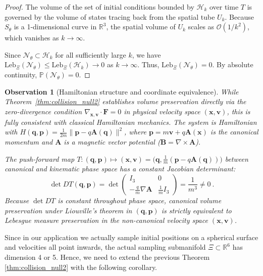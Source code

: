 \documentclass{article}
\newtheorem{obs}{Observation}
\begin{document}
\begin{proof}
		The volume of the set of initial conditions bounded by $\mathcal{H}_k$ over time $T$ is governed by the volume of states tracing back from the spatial tube $U_k$. Because $S_\theta$ is a 1-dimensional curve in $\mathbb{R}^3$, the spatial volume of $U_k$ scales as $\mathcal{O}(1/k^2)$, which vanishes as $k \to \infty$.
		
		Since $\mathcal{N}_\theta \subset \mathcal{H}_k$ for all sufficiently large $k$, we have $\mathrm{Leb}_\Xi(\mathcal{N}_\theta) \le \mathrm{Leb}_\Xi(\mathcal{H}_k) \to 0$ as $k \to \infty$. Thus, $\mathrm{Leb}_\Xi(\mathcal{N}_\theta) = 0$. By absolute continuity, $\mathbb{P}(\mathcal{N}_\theta) = 0$.
	\end{proof}
	
	\begin{obs}[Hamiltonian structure and coordinate equivalence] \label{obs:hamiltonian_equivalence}
		While Theorem~\ref{thm:collision_null2} establishes volume preservation directly via the zero-divergence condition $\nabla_{\mathbf{x},\mathbf{v}} \cdot \mathbf{F} = 0$ in physical velocity space $(\mathbf{x}, \mathbf{v})$, this is fully consistent with classical Hamiltonian mechanics. The system is Hamiltonian with $H(\mathbf{q}, \mathbf{p}) = \frac{1}{2m} \|\mathbf{p} - q\mathbf{A}(\mathbf{q})\|^2$, where $\mathbf{p} = m\mathbf{v} + q\mathbf{A}(\mathbf{x})$ is the canonical momentum and $\mathbf{A}$ is a magnetic vector potential ($\mathbf{B} = \nabla \times \mathbf{A}$). 
		
		The push-forward map $T: (\mathbf{q}, \mathbf{p}) \mapsto (\mathbf{x}, \mathbf{v}) = \big(\mathbf{q}, \frac{1}{m}(\mathbf{p} - q\mathbf{A}(\mathbf{q}))\big)$ between canonical and kinematic phase space has a constant Jacobian determinant:
		\begin{equation}
			\det D T(\mathbf{q},\mathbf{p}) = \det \begin{pmatrix} I_3 & 0 \\ -\frac{q}{m}\nabla\mathbf{A} & \frac{1}{m}I_3 \end{pmatrix} = \frac{1}{m^3} \neq 0 \ .
		\end{equation}
		Because $\det DT$ is constant throughout phase space, canonical volume preservation under Liouville's theorem in $(\mathbf{q},\mathbf{p})$ is strictly equivalent to Lebesgue measure preservation in the non-canonical velocity space $(\mathbf{x},\mathbf{v})$.
	\end{obs}
	
	Since in our application we actually sample initial positions on a spherical surface and velocities all point inwards, the actual sampling submanifold $\Xi \subset \mathbb{R}^6$ has dimension 4 or 5. Hence, we need to extend the previous Theorem \ref{thm:collision_null2} with the following corollary.
	
\end{document}
